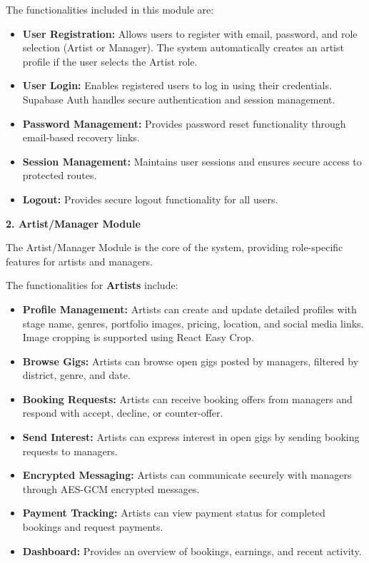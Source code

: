 \documentclass[12pt,a4paper]{report}
\begin{document}
The functionalities included in this module are:

\begin{itemize}

\item \textbf{User Registration:} Allows users to register with email, password, and role selection (Artist or Manager). The system automatically creates an artist profile if the user selects the Artist role.

\item \textbf{User Login:} Enables registered users to log in using their credentials. Supabase Auth handles secure authentication and session management.

\item \textbf{Password Management:} Provides password reset functionality through email-based recovery links.

\item \textbf{Session Management:} Maintains user sessions and ensures secure access to protected routes.

\item \textbf{Logout:} Provides secure logout functionality for all users.

\end{itemize}

\textbf{2. Artist/Manager Module}

The Artist/Manager Module is the core of the system, providing role-specific features for artists and managers.

The functionalities for \textbf{Artists} include:

\begin{itemize}
\item \textbf{Profile Management:} Artists can create and update detailed profiles with stage name, genres, portfolio images, pricing, location, and social media links. Image cropping is supported using React Easy Crop.

\item \textbf{Browse Gigs:} Artists can browse open gigs posted by managers, filtered by district, genre, and date.

\item \textbf{Booking Requests:} Artists can receive booking offers from managers and respond with accept, decline, or counter-offer.

\item \textbf{Send Interest:} Artists can express interest in open gigs by sending booking requests to managers.

\item \textbf{Encrypted Messaging:} Artists can communicate securely with managers through AES-GCM encrypted messages.

\item \textbf{Payment Tracking:} Artists can view payment status for completed bookings and request payments.

\item \textbf{Dashboard:} Provides an overview of bookings, earnings, and recent activity.

\end{itemize}
\end{document}
